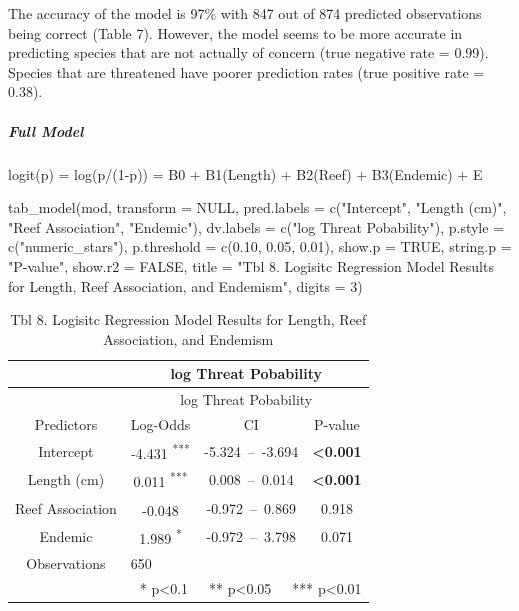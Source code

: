 \documentclass[
  letterpaper,
  DIV=11,
  numbers=noendperiod]{scrartcl}
\let\oldsubparagraph\subparagraph
\renewcommand{\subparagraph}[1]{\oldsubparagraph{#1}\mbox{}}
\newenvironment{Shaded}{\begin{snugshade}}{\end{snugshade}}
\newcommand{\AttributeTok}[1]{\textcolor[rgb]{0.40,0.45,0.13}{#1}}
\newcommand{\ConstantTok}[1]{\textcolor[rgb]{0.56,0.35,0.01}{#1}}
\newcommand{\DecValTok}[1]{\textcolor[rgb]{0.68,0.00,0.00}{#1}}
\newcommand{\FloatTok}[1]{\textcolor[rgb]{0.68,0.00,0.00}{#1}}
\newcommand{\FunctionTok}[1]{\textcolor[rgb]{0.28,0.35,0.67}{#1}}
\newcommand{\NormalTok}[1]{\textcolor[rgb]{0.00,0.23,0.31}{#1}}
\newcommand{\StringTok}[1]{\textcolor[rgb]{0.13,0.47,0.30}{#1}}
\begin{document}
The accuracy of the model is 97\% with 847 out of 874 predicted
observations being correct (Table 7). However, the model seems to be
more accurate in predicting species that are not actually of concern
(true negative rate = 0.99). Species that are threatened have poorer
prediction rates (true positive rate = 0.38).

\hypertarget{full-model}{%
\subparagraph{\texorpdfstring{\textbf{Full
Model}}{Full Model}}\label{full-model}}

logit(p) = log(p/(1-p)) = B0 + B1(Length) + B2(Reef) + B3(Endemic) + E

\begin{Shaded}
\begin{Highlighting}[]
\FunctionTok{tab\_model}\NormalTok{(mod,}
          \AttributeTok{transform =} \ConstantTok{NULL}\NormalTok{,}
          \AttributeTok{pred.labels =} \FunctionTok{c}\NormalTok{(}\StringTok{"Intercept"}\NormalTok{, }\StringTok{"Length (cm)"}\NormalTok{, }
                          \StringTok{"Reef Association"}\NormalTok{, }\StringTok{"Endemic"}\NormalTok{),}
          \AttributeTok{dv.labels =} \FunctionTok{c}\NormalTok{(}\StringTok{"log Threat Pobability"}\NormalTok{),}
          \AttributeTok{p.style =} \FunctionTok{c}\NormalTok{(}\StringTok{"numeric\_stars"}\NormalTok{),}
          \AttributeTok{p.threshold =} \FunctionTok{c}\NormalTok{(}\FloatTok{0.10}\NormalTok{, }\FloatTok{0.05}\NormalTok{, }\FloatTok{0.01}\NormalTok{),}
          \AttributeTok{show.p =} \ConstantTok{TRUE}\NormalTok{,}
          \AttributeTok{string.p =} \StringTok{"P{-}value"}\NormalTok{,}
          \AttributeTok{show.r2 =} \ConstantTok{FALSE}\NormalTok{,}
          \AttributeTok{title =} \StringTok{"Tbl 8. Logisitc Regression Model Results for Length, Reef Association, and Endemism"}\NormalTok{,}
          \AttributeTok{digits =} \DecValTok{3}\NormalTok{)}
\end{Highlighting}
\end{Shaded}

\begin{longtable}[]{@{}cccc@{}}
\caption{Tbl 8. Logisitc Regression Model Results for Length, Reef
Association, and Endemism}\tabularnewline
\toprule()
~ & \multicolumn{3}{c}{log Threat Pobability} \\
\midrule()
\endfirsthead
\toprule()
~ & \multicolumn{3}{c}{log Threat Pobability} \\
\midrule()
\endhead
Predictors & Log-Odds & CI & P-value \\
Intercept & -4.431 \textsuperscript{***} & -5.324~--~-3.694 &
\textbf{\textless0.001} \\
Length (cm) & 0.011 \textsuperscript{***} & 0.008~--~0.014 &
\textbf{\textless0.001} \\
Reef Association & -0.048 \textsuperscript{} & -0.972~--~0.869 &
0.918 \\
Endemic & 1.989 \textsuperscript{*} & -0.972~--~3.798 & 0.071 \\
Observations & \multicolumn{3}{l}{650} \\
\multicolumn{4}{r}{* p\textless0.1~~~** p\textless0.05~~~***
p\textless0.01} \\
\bottomrule()
\end{longtable}
\end{document}
